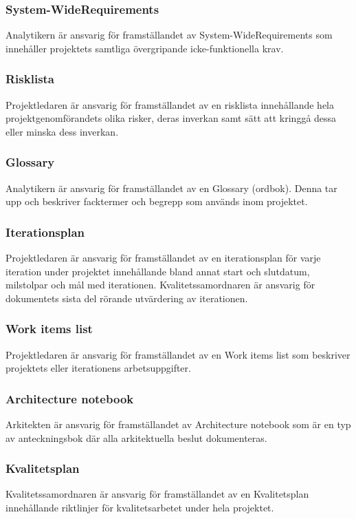 \subsubsection{System-WideRequirements}
Analytikern är ansvarig för framställandet av System-WideRequirements som innehåller projektets samtliga övergripande icke-funktionella krav.

\subsubsection{Risklista}
Projektledaren är ansvarig för framställandet av en risklista innehållande hela projektgenomförandets olika risker, deras inverkan samt sätt att kringgå dessa eller minska dess inverkan.

\subsubsection{Glossary}
Analytikern är ansvarig för framställandet av en Glossary (ordbok). Denna tar upp och beskriver facktermer och begrepp som används inom projektet.

\subsubsection{Iterationsplan}
Projektledaren är ansvarig för framställandet av en iterationsplan för varje iteration under projektet innehållande bland annat start och slutdatum, milstolpar och mål med iterationen. Kvalitetssamordnaren är ansvarig för dokumentets sista del rörande utvärdering av iterationen.

\subsubsection{Work items list}
Projektledaren är ansvarig för framställandet av en Work items list som beskriver projektets eller iterationens arbetsuppgifter.

\subsubsection{Architecture notebook}
Arkitekten är ansvarig för framställandet av Architecture notebook som är en typ av anteckningsbok där alla arkitektuella beslut dokumenteras.

\subsubsection{Kvalitetsplan}
Kvalitetssamordnaren är ansvarig för framställandet av en Kvalitetsplan innehållande riktlinjer för kvalitetsarbetet under hela projektet.

